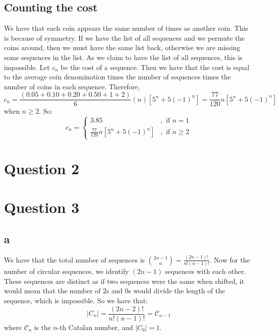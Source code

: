 \documentclass[]{article}
\theoremstyle{definition}
\numberwithin{theorem}{section}
\numberwithin{equation}{section}
\begin{document}
\subsection{Counting the cost}
We have that each coin appears the same number of times as another coin. This is because of symmetry. If we have the list of all sequences and we permute the coins around, then we must have the same list back, otherwise we are missing some sequences in the list. As we claim to have the list of all sequences, this is impossible. Let $c_n$ be the cost of a sequence. Then we have that the cost is equal to the average coin denomination times the number of sequences times the number of coins in each sequence. Therefore,
\begin{equation}
	c_n = \frac{(0.05 + 0.10 + 0.20 + 0.50 + 1 + 2) }{6}(n) \left[5^n + 5(-1)^n \right] =  \frac{77}{120} n \left[5^n + 5(-1)^n \right]
\end{equation}
when $n \geq 2$.
So:
\begin{equation}
	c_n = 
	\begin{cases}
		3.85 &, \text{ if } n = 1\\
		\frac{77}{120} n \left[5^n + 5(-1)^n \right] &, \text{ if } n \geq 2
	\end{cases}
\end{equation}

\section{Question 2}

\section{Question 3}
\subsection{a}
We have that the total number of sequences is $\binom{2n-1}{n}= \frac{(2n -1 )!}{n! (n - 1)!}$. Now for the number of circular sequences, we identify $(2n - 1)$ sequences with each other. These sequences are distinct as if two sequences were the same when shifted, it would mean that the number of $2$s and $0$s would divide the length of the sequence, which is impossible. So we have that:
\begin{equation}
	|C_n| = \frac{(2n - 2)!}{n!(n - 1)!} = \mathcal{C}_{n - 1}
\end{equation}
where $\mathcal{C}_{n}$ is the $n$-th Catalan number, and $|C_0| = 1$. 
\end{document}
